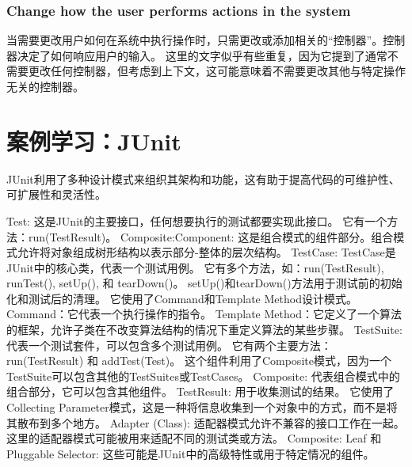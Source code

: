 \subsubsection{Change how the user performs actions in the system}
当需要更改用户如何在系统中执行操作时，只需更改或添加相关的“控制器”。控制器决定了如何响应用户的输入。
这里的文字似乎有些重复，因为它提到了通常不需要更改任何控制器，但考虑到上下文，这可能意味着不需要更改其他与特定操作无关的控制器。


\section{案例学习：JUnit}

JUnit利用了多种设计模式来组织其架构和功能，这有助于提高代码的可维护性、可扩展性和灵活性。

Test:
这是JUnit的主要接口，任何想要执行的测试都要实现此接口。
它有一个方法：run(TestResult)。
Composite:Component:
这是组合模式的组件部分。组合模式允许将对象组成树形结构以表示部分-整体的层次结构。
TestCase:
TestCase是JUnit中的核心类，代表一个测试用例。
它有多个方法，如：run(TestResult), runTest(), setUp(), 和 tearDown()。
setUp()和tearDown()方法用于测试前的初始化和测试后的清理。
它使用了Command和Template Method设计模式。
Command：它代表一个执行操作的指令。
Template Method：它定义了一个算法的框架，允许子类在不改变算法结构的情况下重定义算法的某些步骤。
TestSuite:
代表一个测试套件，可以包含多个测试用例。
它有两个主要方法：run(TestResult) 和 addTest(Test)。
这个组件利用了Composite模式，因为一个TestSuite可以包含其他的TestSuites或TestCases。
Composite:
代表组合模式中的组合部分，它可以包含其他组件。
TestResult:
用于收集测试的结果。
它使用了Collecting Parameter模式，这是一种将信息收集到一个对象中的方式，而不是将其散布到多个地方。
Adapter (Class):
适配器模式允许不兼容的接口工作在一起。这里的适配器模式可能被用来适配不同的测试类或方法。
Composite: Leaf 和 Pluggable Selector:
这些可能是JUnit中的高级特性或用于特定情况的组件。

